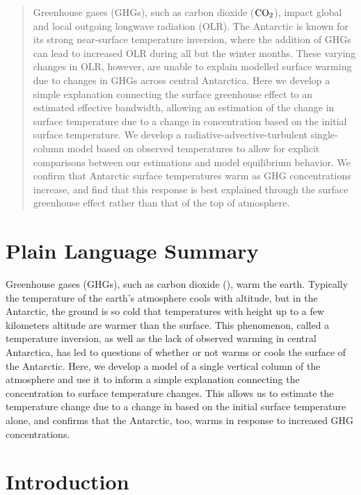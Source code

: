 \documentclass[draft]{agujournal2019}
\begin{document}
\begin{abstract}
Greenhouse gases (GHGs), such as carbon dioxide ($\ce{CO_2}$), impact global and local outgoing longwave radiation (OLR). The Antarctic is known for its strong near-surface temperature inversion, where the addition of GHGs can lead to increased OLR during all but the winter months. These varying changes in OLR, however, are unable to explain modelled surface warming due to changes in GHGs across central Antarctica. Here we develop a simple explanation connecting the surface greenhouse effect to an estimated effective bandwidth, allowing an estimation of the change in surface temperature due to a change in  concentration based on the initial surface temperature. We develop a radiative-advective-turbulent single-column model based on observed temperatures to allow for explicit comparisons between our estimations and model equilibrium behavior. We confirm that Antarctic surface temperatures warm as GHG concentrations increase, and find that this response is best explained through the surface greenhouse effect rather than that of the top of atmosphere.
\end{abstract}

\section*{Plain Language Summary}
Greenhouse gases (GHGs), such as carbon dioxide (), warm the earth. Typically the temperature of the earth's atmosphere cools with altitude, but in the Antarctic, the ground is so cold that temperatures with height up to a few kilometers altitude are warmer than the surface. This phenomenon, called a temperature inversion, as well as the lack of observed warming in central Antarctica, has led to questions of whether or not  warms or cools the surface of the Antarctic. Here, we develop a model of a single vertical column of the atmosphere and use it to inform a simple explanation connecting the  concentration to surface temperature changes. This allows us to estimate the temperature change due to a change in  based on the initial surface temperature alone, and confirms that the Antarctic, too, warms in response to increased GHG concentrations.


%
%

\section{Introduction}
%
\end{document}
